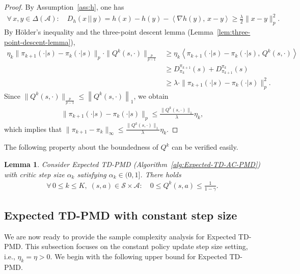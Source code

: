 \documentclass[10pt]{article}
\newcommand{\calA}{\mathcal{A}}
\newcommand{\calS}{\mathcal{S}}
\newcommand{\ls}{\left}
\newcommand{\rs}{\right}
\theoremstyle{plain}
\newtheorem{lemma}[theorem]{Lemma}
\theoremstyle{definition}
\begin{document}
\begin{proof}
    By Assumption~\ref{ass:h}, one has
    \begin{align*}
        \forall\, x, y\in\Delta(\calA): \quad D_h(x \, || \, y) = h(x)-h(y) - \ls\langle \nabla h(y), \, x-y \rs\rangle \geq \frac{\lambda}{2} {\| x - y \|_p^2.}
    \end{align*}
    By H\"older's inequality and the three-point descent lemma (Lemma~\ref{lem:three-point-descent-lemma}), 
    \begin{align*}
        \eta_k  \| \pi_{k+1}(\cdot|s) - \pi_k(\cdot|s) \|_p \cdot \| Q^k(s,\cdot) \|_{\frac{p}{p-1}} &\geq \eta_k \ls\langle \pi_{k+1}(\cdot|s) - \pi_k(\cdot|s), \, Q^k(s,\cdot) \rs\rangle \\
        &\geq D_{\pi_k}^{\pi_{k+1}}(s) + D^{\pi_k}_{\pi_{k+1}}(s) \\
        &\geq \lambda \cdot \| \pi_{k+1}(\cdot|s) - \pi_k(\cdot|s) \|_p^2.
    \end{align*}
    Since $\| Q^k(s,\cdot) \|_{\frac{p}{p-1}} \leq \ls\| Q^k(s,\cdot) \rs\|_1$, we obtain
    \begin{align*}
        \| \pi_{k+1}(\cdot|s) - \pi_k(\cdot|s) \|_p \leq \frac{\| Q^k(s,\cdot) \|_1}{\lambda} \eta_k,
    \end{align*}
    which implies that $\| \pi_{k+1} - \pi_k \|_\infty \leq \frac{\| Q^k(s,\cdot) \|_1}{\lambda} \eta_k$.
\end{proof}


The following property about the boundedness of $Q^k$ can be verified easily.
\begin{lemma}
    Consider Expected TD-PMD \textup{(}Algorithm~\ref{alg:Expected-TD-AC-PMD}\textup{)} with critic step size $\alpha_k$ satisfying $\alpha_k \in (0,1]$. There holds
    \begin{align*}
        \forall\, 0 \leq k \leq K, \; (s,a)\in\calS\times\calA: \quad 0 \leq Q^k(s,a) \leq \frac{1}{1-\gamma}.
    \end{align*}
    \label{lem:Expected-TD-AC-PMD:bounded-value}
\end{lemma}

\subsection{Expected TD-PMD with constant step size}
\label{sec:Expected-TD-AC-PMD-with-constant-step-size}
We are now ready to provide the sample complexity analysis for Expected TD-PMD. This subsection focuses on the constant policy update step size setting, i.e., $\eta_k = \eta > 0$. We begin with the following upper bound for Expected TD-PMD.
\end{document}
